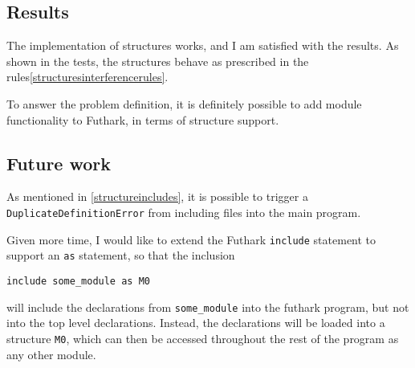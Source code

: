 \subsection{Results}
\label{subsec:structuresresults}
The implementation of structures works, and I am satisfied with the results. As
shown in the tests, the structures behave as prescribed in the rules\ref{structuresinterferencerules}.

To answer the problem definition, it is definitely possible to add module
functionality to Futhark, in terms of structure support.
\subsection{Future work}
\label{subsec:structuresfuturework}
As mentioned in \ref{structureincludes}, it is possible to trigger a
\texttt{DuplicateDefinitionError} from including files into the main program.

Given more time, I would like to extend the Futhark \texttt{include} statement
to support an \texttt{as} statement, so that the inclusion

\texttt{include some\_module as M0}

will include the declarations from \texttt{some\_module} into the futhark program, but not
into the top level declarations. Instead, the declarations will be loaded into a
structure \texttt{M0}, which can then be accessed throughout the rest of the program as
any other module.